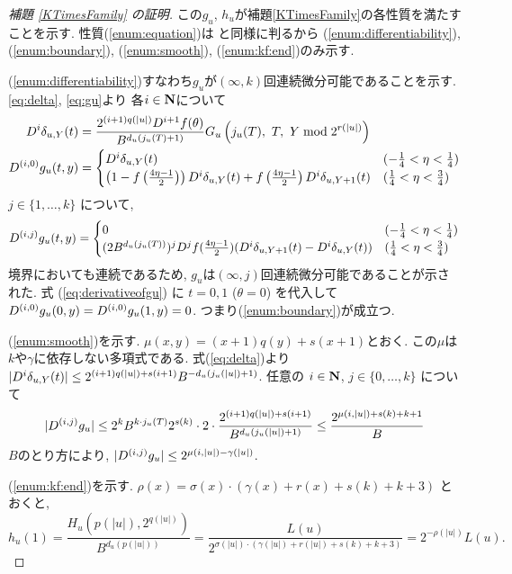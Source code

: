 \begin{proof}[\rm 補題 \ref{KTimesFamily} の証明]
この$g_u$, $h_u$が補題\ref{KTimesFamily}の各性質を満たすことを示す. 
性質(\ref{enum:equation})は
\cite[補題 4.1]{kawamura2010lipschitz}と同様に判るから
(\ref{enum:differentiability}), 
(\ref{enum:boundary}), 
(\ref{enum:smooth}), 
(\ref{enum:kf:end})のみ示す. 

  (\ref{enum:differentiability})すなわち$g _u$が$(\infty, k)$回連続微分可能であることを示す.
  \eqref{eq:delta}, \eqref{eq:gu}より
  各$i \in \mathbf N$について
  \begin{align}
   D^i \delta_{u,Y}(t) 
&
    = \frac{2^{(i+1)q(|u|)} D^{i+1}f(\theta)}{B^{d_u(j_u(T)+1)}}
    G_u\left( j_u(T),\ T,\ Y \bmod 2^{r(|u|)} \right)
\\
   \label{eq:derivativeofgu}
    D^{(i,0)} g_u(t, y)
&
     = \begin{cases}
 	D^i \delta_{u, Y}(t) 
	& (- \frac 1 4 < \eta < \frac 1 4) \\
	\left( 1-f \left(\frac{4\eta-1}{2}\right)\right) 
	D^i \delta_{u, Y}(t)
	+ f \left(\frac{4\eta-1}{2}\right) D^i \delta_{u,Y+1}(t) 
	& (\frac 1 4 < \eta < \frac 3 4)
       \end{cases}
  \end{align}
  $j \in \{1, \dots , k\}$ について,
  \begin{equation}
    D^{(i,j)} g_u(t, y)
     = \begin{cases}
	0 & (- \frac 1 4 < \eta < \frac 1 4) \\
	(2B^{d_u(j_u(T))})^j D^j f(\frac{4\eta - 1}2)
	(D^i \delta_{u,Y+1}(t)-D^i \delta_{u, Y}(t)) 
	& (\frac 1 4 < \eta < \frac 3 4)
       \end{cases}
  \end{equation}
  境界においても連続であるため,
  $g _u$は$(\infty, j)$回連続微分可能であることが示された.
  式 (\ref{eq:derivativeofgu}) に $t = 0, 1$ ($\theta = 0$) を代入して
  $D^{(i, 0)} g_u(0,y) = D^{(i, 0)} g_u(1,y) = 0$.
  つまり(\ref{enum:boundary})が成立つ.

  (\ref{enum:smooth})を示す.
  $\mu(x, y) = (x+1)q(y) + s(x+1)$とおく.
  この$\mu$は$k$や$\gamma$に依存しない多項式である.
  式(\ref{eq:delta})より
  $|D^i \delta_{u,Y}(t)| \le 2^{(i+1)q(|u|) + s(i+1)}B^{-d_u(j_u(|u|)+1)}$.
  任意の $i \in \mathbf N$, $j \in \{0, \dots, k\}$ について
  \begin{equation}
   |D^{(i,j)} g_u| 
   \le 
   2^k B^{k \cdot j_u(T)} 2^{s(k)} \cdot 2 \cdot 
   \frac{2^{(i+1)q(|u|) + s(i+1)}}{B^{d_u(j_u(|u|)+1)}} 
   \le
   \frac{2^{\mu(i, |u|) + s(k) + k + 1}}{B}
  \end{equation}
  $B$のとり方により, $|D^{(i,j)} g_u| \leq 2^{\mu(i, |u|) - \gamma(|u|)}$.

  (\ref{enum:kf:end})を示す.
  $\rho(x) = \sigma(x) \cdot (\gamma(x)+r(x)+s(k)+k+3)$ とおくと,
  \begin{equation}
   h_u(1) = \frac{H_u(p(|u|), 2^{q(|u|)})}{B^{d_u(p(|u|))}} 
          = \frac{L(u)}{2^{\sigma(|u|) \cdot (\gamma(|u|)+r(|u|)+s(k)+k+3)}}
	  = 2^{-\rho(|u|)} L(u).
  \end{equation}
 \end{proof}




